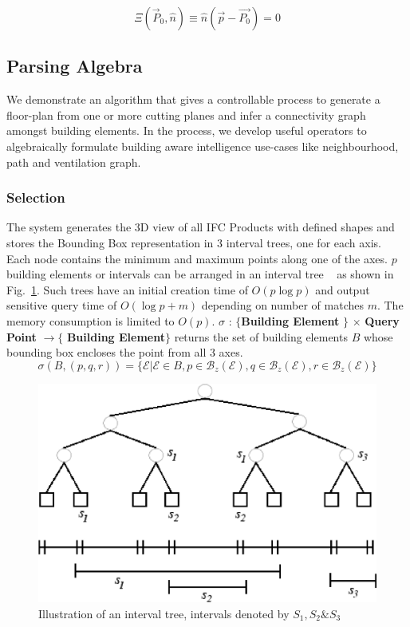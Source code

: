 \documentclass[conference]{IEEEtran}
\begin{document}
\begin{equation}
    \Xi (\vec{P}_0, \hat{n}) \equiv \hat{n}(\vec{p}-\vec{P_0})=0
    \label{eq:cutting-plane}
\end{equation}

\subsection{Parsing Algebra}
We demonstrate an algorithm that gives a controllable process to generate a floor-plan from one or more cutting planes and infer a connectivity graph amongst building elements. In the process, we develop useful operators to algebraically formulate building aware intelligence use-cases like neighbourhood, path and ventilation graph. 


\subsubsection{Selection}
 The system generates the 3D view of all IFC Products with defined shapes and stores the Bounding Box representation in 3 interval trees, one for each axis. Each node contains the minimum and maximum points along one of the axes.  $p$ building elements or intervals can be arranged in an interval tree ~\cite{de1997computational} as shown in Fig.~\ref{fig:intervaltree}. Such trees have an initial creation time of $O(p \log p)$ and output sensitive query time of $O(\log p + m)$ depending on number of matches $m$.  The memory consumption is limited to $O(p)$.
$\sigma$ : $\{$\textbf{Building Element} $\}$ $\times$ \textbf{Query Point} $\rightarrow \{$ \textbf{Building Element}$ \}$  returns the set of building elements $B$ whose bounding box encloses the point from all 3 axes.  
\begin{equation}
    \sigma(B, (p,q,r)) = \{ \mathcal{E}|\mathcal{E} \in B ,  p \in \mathcal{B}_z(\mathcal{E}) , q \in \mathcal{B}_z(\mathcal{E}) ,  r \in \mathcal{B}_z(\mathcal{E}) \}
    \label{eq:select}
\end{equation}


\begin{figure}[]
\centering
  \includegraphics[width=0.5\linewidth]{img/intervaltree.png}
  \caption{Illustration of an interval tree, intervals denoted by $S_1, S_2 \& S_3$   }
  \label{fig:intervaltree}
\end{figure}
\end{document}

